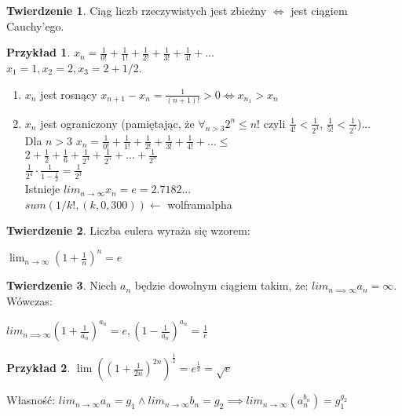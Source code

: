 \documentclass{article}
\theoremstyle{definition}
\theoremstyle{definition}
\newtheorem{tw}{Twierdzenie}[subsection]
\theoremstyle{definition}
\newtheorem{pk}{Przykład}[subsection]
\theoremstyle{definition}
\begin{document}
\begin{tw}
Ciąg liczb rzeczywistych jest zbieżny $\iff$ jest ciągiem Cauchy'ego.
\end{tw}

\begin{pk}
$x_n = \frac{1}{0!} + \frac{1}{1!} + \frac{1}{2!} + \frac{1}{3!} + \frac{1}{4!} + ...$\\
$x_1 = 1, x_2 = 2, x_3 = 2 + 1/2$.
\begin{enumerate}
    \item $x_n$ jest rosnący $x_{n+1}-x_n=\frac{1}{(n+1)!}>0 \iff x_{n_1}>x_n$
    \item $x_n$ jest ograniczony (pamiętając, że $\forall_{n>3} 2^n\leq n!$
    czyli $\frac{1}{4!} < \frac{1}{2^4}$, $\frac{1}{5!} < \frac{1}{2^5}$)...\\
    Dla $n>3$ $x_n=\frac{1}{0!} + \frac{1}{1!} + \frac{1}{2!} + \frac{1}{3!} + \frac{1}{4!} + ...\leq$\\
    $2+\frac{1}{2}+\frac{1}{6}+\frac{1}{2^4}+\frac{1}{2^5}+...+\frac{1}{2^n}$\\
    $\frac{1}{2^4}\cdot\frac{1}{1-\frac{1}{2}}=\frac{1}{2^3}$\\
    Istnieje $lim_{n\rightarrow \infty} x_n = e = 2.7182...$\\
    $sum(1/k!, (k,0,300))\leftarrow$ wolframalpha
\end{enumerate}
\end{pk}

\begin{tw}
    Liczba eulera wyraża się wzorem:
    \begin{center}
    $\lim_{n\rightarrow \infty} (1+\frac{1}{n})^n = e$
    \end{center}
\end{tw}

\begin{tw}
    Niech $a_n$ będzie dowolnym ciągiem takim, że:
    $lim_{n\implies \infty} a_n = \infty$. Wówczas:\\
    \begin{center}
    $lim_{n\implies \infty} (1+\frac{1}{a_n})^{a_n} = e, (1-\frac{1}{a_n})^{a_n} = \frac{1}{e}$
    \end{center}
\end{tw}

\begin{pk}
    $\lim ((1+\frac{1}{2n})^{2n})^{\frac{1}{2}}=e^{\frac{1}{2}}=\sqrt{e}$
\end{pk}

Własność: $lim_{n\rightarrow \infty} a_n = g_1 \land lim_{n\rightarrow \infty} b_n = g_2 \implies lim_{n\rightarrow \infty} (a_n^{b_n})=g_1^{g_2}$
\end{document}

